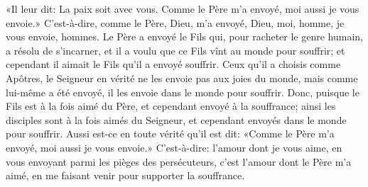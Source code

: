 «Il leur dit: La paix soit avec vous.
	Comme le Père m’a envoyé, moi aussi je vous envoie.»
C’est-à-dire, comme le Père, Dieu, m’a envoyé, Dieu,
	moi, homme, je vous envoie, hommes.
Le Père a envoyé le Fils qui, pour racheter le genre humain,
	a résolu de s’incarner,
	et il a voulu que ce Fils vînt au monde pour souffrir;
	et cependant il aimait le Fils qu’il a envoyé souffrir.
Ceux qu’il a choisis comme Apôtres,
	le Seigneur en vérité ne les envoie pas aux joies du monde,
	mais comme lui-même a été envoyé, il les envoie dans le monde pour souffrir.
Donc, puisque le Fils est à la fois aimé du Père,
	et cependant envoyé à la souffrance;
	ainsi les disciples sont à la fois aimés du Seigneur,
	et cependant envoyés dans le monde pour souffrir.
Aussi est-ce en toute vérité qu’il est dit:
	«Comme le Père m’a envoyé, moi aussi je vous envoie.»
C’est-à-dire: l’amour dont je vous aime,
	en vous envoyant parmi les pièges des persécuteurs,
	c’est l’amour dont le Père m’a aimé,
	en me faisant venir pour supporter la souffrance.
